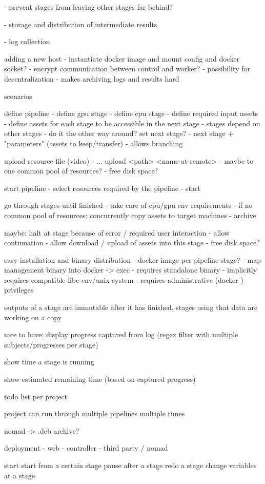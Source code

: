 - prevent stages from leaving other stages far behind?

- storage and distribution of intermediate results

- log collection




adding a new host
 - instantiate docker image and mount config and docker socket?
 - encrypt communication between control and worker?
 - possibility for decentralization
    - makes archiving logs and results hard


scenarios

define pipeline
 - define gpu stage
 - define cpu stage
 - define required input assets
 - define assets for each stage to be accessible in the next stage
 - stages depend on other stages
    - do it the other way around? set next stage?
       - next stage + "parameters" (assets to keep/transfer)
       - allows branching

upload resource file (video)
 - ... upload <path> <name-at-remote>
 - maybe to one common pool of resources?
    - free disk space?

start pipeline
 - select resources required by the pipeline
 - start
 
go through stages until finished
 - take care of cpu/gpu env requirements
 - if no common pool of resources: concurrently copy assets to target machines
 - archive 

maybe: halt at stage because of error / required user interaction
 - allow continuation
 - allow download / upload of assets into this stage
    - free disk space?
 
 
 easy installation and binary distribution
  - docker image per pipeline stage?
  - map management binary into docker -> exec
     - requires standalone binary
     - implicitly requires compatible libc env/unix system
     - requires administrative (docker ) privileges
     
 
 outputs of a stage are immutable after it has finished, stages using that data are working on a copy
 
 nice to have: display progress captured from log (regex filter with multiple subjects/progresses per stage)
 
 show time a stage is running
 
 show estimated remaining time (based on captured progress)
     
  todo list per project
  
  project can run through multiple pipelines multiple times
  
  nomad -> .deb archive?
  
deployment
 - web
 - controller
 - third party / nomad
     
start
start from a certain stage
pause after a stage
redo a stage
change variables at a stage